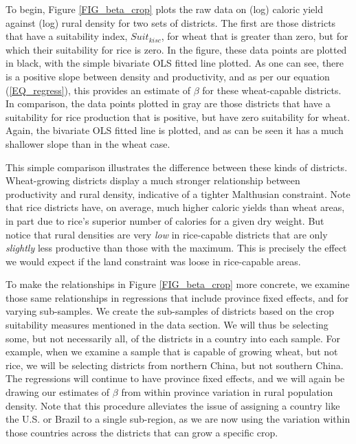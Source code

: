 \documentclass[11pt]{article}
\begin{document}
To begin, Figure \ref{FIG_beta_crop} plots the raw data on (log) caloric yield against (log) rural density for two sets of districts. The first are those districts that have a suitability index, $Suit_{kisc}$, for wheat that is greater than zero, but for which their suitability for rice is zero. In the figure, these data points are plotted in black, with the simple bivariate OLS fitted line plotted. As one can see, there is a positive slope between density and productivity, and as per our equation (\ref{EQ_regress}), this provides an estimate of $\beta$ for these wheat-capable districts. In comparison, the data points plotted in gray are those districts that have a suitability for rice production that is positive, but have zero suitability for wheat. Again, the bivariate OLS fitted line is plotted, and as can be seen it has a much shallower slope than in the wheat case.

This simple comparison illustrates the difference between these kinds of districts. Wheat-growing districts display a much stronger relationship between productivity and rural density, indicative of a tighter Malthusian constraint. Note that rice districts have, on average, much higher caloric yields than wheat areas, in part due to rice's superior number of calories for a given dry weight. But notice that rural densities are very \textit{low} in rice-capable districts that are only \textit{slightly} less productive than those with the maximum. This is precisely the effect we would expect if the land constraint was loose in rice-capable areas. 

To make the relationships in Figure \ref{FIG_beta_crop} more concrete, we examine those same relationships in regressions that include province fixed effects, and for varying sub-samples. We create the sub-samples of districts based on the crop suitability measures mentioned in the data section. We will thus be selecting some, but not necessarily all, of the districts in a country into each sample. For example, when we examine a sample that is capable of growing wheat, but not rice, we will be selecting districts from northern China, but not southern China. The regressions will continue to have province fixed effects, and we will again be drawing our estimates of $\beta$ from within province variation in rural population density. Note that this procedure alleviates the issue of assigning a country like the U.S. or Brazil to a single sub-region, as we are now using the variation within those countries across the districts that can grow a specific crop.
\end{document}
